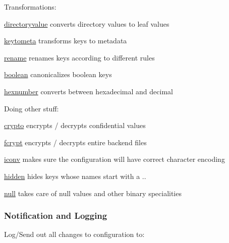 Transformations\+:


\begin{DoxyItemize}
\item \hyperlink{md_src_plugins_directoryvalue_README_src_plugins_directoryvalue_README_md}{directoryvalue} converts directory values to leaf values
\item \hyperlink{md_src_plugins_keytometa_README_src_plugins_keytometa_README_md}{keytometa} transforms keys to metadata
\item \hyperlink{md_src_plugins_rename_README_src_plugins_rename_README_md}{rename} renames keys according to different rules
\item \hyperlink{md_src_plugins_boolean_README_src_plugins_boolean_README_md}{boolean} canonicalizes boolean keys
\item \hyperlink{md_src_plugins_hexnumber_README_src_plugins_hexnumber_README_md}{hexnumber} converts between hexadecimal and decimal
\end{DoxyItemize}

Doing other stuff\+:


\begin{DoxyItemize}
\item \hyperlink{md_src_plugins_crypto_README_src_plugins_crypto_README_md}{crypto} encrypts / decrypts confidential values
\item \hyperlink{md_src_plugins_fcrypt_README_src_plugins_fcrypt_README_md}{fcrypt} encrypts / decrypts entire backend files
\item \hyperlink{md_src_plugins_iconv_README_src_plugins_iconv_README_md}{iconv} makes sure the configuration will have correct character encoding
\item \hyperlink{md_src_plugins_hidden_README_src_plugins_hidden_README_md}{hidden} hides keys whose names start with a {\ttfamily .}.
\item \hyperlink{md_src_plugins_null_README_src_plugins_null_README_md}{null} takes care of null values and other binary specialities
\end{DoxyItemize}

\subsubsection*{Notification and Logging}

Log/\+Send out all changes to configuration to\+:


